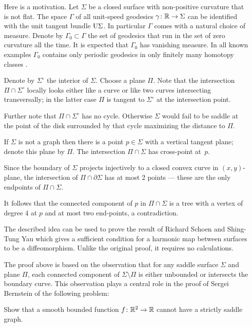 Here is a motivation.
Let $\Sigma$ be a closed surface with non-positive curvature that is not flat.
The space $\Gamma$ of all unit-speed geodesics $\gamma\:\RR\z\to\Sigma$ can be identified with the unit tangent bundle $\mathrm{U}\Sigma$. 
In particular $\Gamma$ comes with a natural choice of measure.
Denote by $\Gamma_0\subset \Gamma$ the set of geodesics that run in the set of zero curvature all the time.
It is expected that $\Gamma_0$ has vanishing measure.
In all known examples $\Gamma_0$ contains only periodic geodesics in only finitely many homotopy classes \cite[see also][]{hertz}.

Denote by $\Sigma^\circ$ the interior of $\Sigma$.
Choose a plane $\Pi$. 
Note that the intersection $\Pi\cap \Sigma^\circ$ 
locally looks either like a curve or like two curves intersecting transversally;
in the latter case $\Pi$ is tangent to $\Sigma^\circ$ at the intersection point.

Further note that $\Pi\cap \Sigma^\circ$ has no cycle.
Otherwise $\Sigma$ would fail to be saddle at the point of the disk surrounded by that cycle maximizing the distance to $\Pi$.

If $\Sigma$ is not a graph then there is a point $p\in\Sigma$ with a vertical tangent plane;
denote this plane by $\Pi$.
The intersection $\Pi\cap\Sigma$ has cross-point at~$p$.

Since the boundary of $\Sigma$ projects injectively to a closed convex curve in $(x,y)$-plane,
the intersection of $\Pi\cap\partial \Sigma$ has at most 2 points --- these are the only endpoints of $\Pi\cap\Sigma$.

It follows that the connected component of $p$ in $\Pi\cap\Sigma$ is a tree 
with a vertex of degree 4 at $p$ and at most two end-points, a contradiction.\qeds

The described idea can be used to prove the result of Richard Schoen and Shing-Tung  Yau \cite{schoen-yau-2D} which gives a sufficient condition for a harmonic map between surfaces to be a diffeomorphism.
Unlike the original proof, it requires no calculations.

The proof above is based on the observation 
that for any saddle surface $\Sigma$ and plane $\Pi$,
each connected component of $\Sigma\setminus \Pi$ is either unbounded or intersects the boundary curve.
This observation plays a central role in the proof of Sergei Bernstein \cite{bernshtein}
of the following problem:

\begin{pr}
Show that a smooth bounded function $f\colon\mathbb{R}^2\to\mathbb{R}$ cannot have a strictly saddle graph.
\end{pr}

